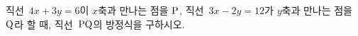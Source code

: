 직선~$4x+3y=6$이 $x$축과 만나는 점을 $\mathrm{P}$, 직선~$3x-2y=12$가 $y$축과 만나는 점을 $\mathrm{Q}$라 할 때, 직선~$\mathrm{PQ}$의 방정식을 구하시오.
